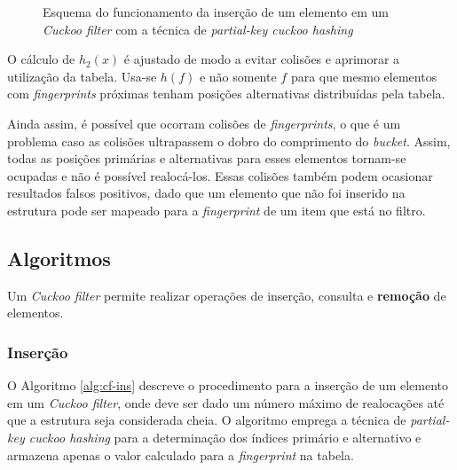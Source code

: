 \documentclass[12pt,twoside,english,brazilian]{article}
\begin{document}
\begin{figure}
\begin{center}
        \caption{\label{cuckoo-filter-insert} Esquema do funcionamento da inserção de um elemento em um \textit{Cuckoo filter} com a técnica de \textit{partial-key cuckoo hashing}}
    \end{center}
\end{figure}

O cálculo de $h_2(x)$ é ajustado de modo a evitar colisões e aprimorar a utilização da tabela. Usa-se $h(f)$ e não somente $f$ para que mesmo elementos com \textit{fingerprints} próximas tenham posições alternativas distribuídas pela tabela.

Ainda assim, é possível que ocorram colisões de \textit{fingerprints}, o que é um problema caso as colisões ultrapassem o dobro do comprimento do \textit{bucket}. Assim, todas as posições primárias e alternativas para esses elementos tornam-se ocupadas e não é possível realocá-los. Essas colisões também podem ocasionar resultados falsos positivos, dado que um elemento que não foi inserido na estrutura pode ser mapeado para a \textit{fingerprint} de um item que está no filtro.

\subsection{Algoritmos}

Um \textit{Cuckoo filter} permite realizar operações de inserção, consulta e \textbf{remoção} de elementos.

\subsubsection{Inserção}

O Algoritmo \ref{alg:cf-ins} descreve o procedimento para a inserção de um elemento em um \textit{Cuckoo filter}, onde deve ser dado um número máximo de realocações até que a estrutura seja considerada cheia. O algoritmo emprega a técnica de \textit{partial-key cuckoo hashing} para a determinação dos índices primário e alternativo e armazena apenas o valor calculado para a \textit{fingerprint} na tabela.
\end{document}
